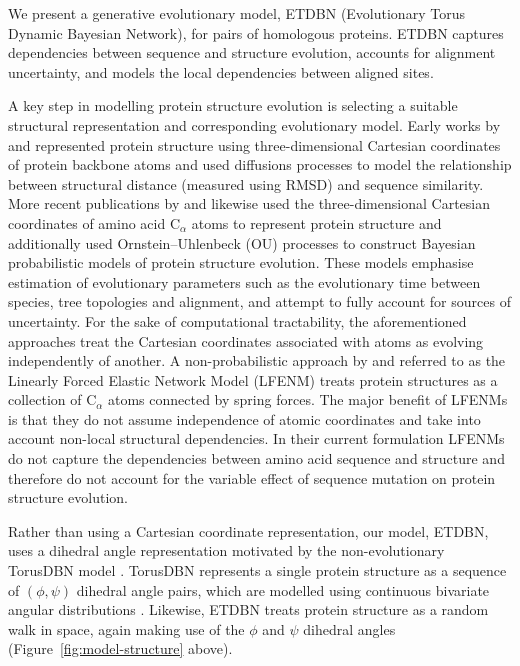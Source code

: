 \documentclass[nogrid]{MBE}%
\begin{document}
We present a generative evolutionary model, ETDBN (Evolutionary Torus Dynamic Bayesian Network), for pairs of homologous proteins. ETDBN captures dependencies between sequence and structure evolution, accounts for alignment uncertainty, and models the local dependencies between aligned sites.

A key step in modelling protein structure evolution is selecting a suitable structural representation and corresponding evolutionary model. Early works by \citet{gutin1994evolution} and \citet{grishin1997estimation} represented protein structure using three-dimensional Cartesian coordinates of protein backbone atoms and used diffusions processes to model the relationship between structural distance (measured using RMSD) and sequence similarity. More recent publications by \citet{challis2012stochastic} and \citet{herman2014simultaneous} likewise used the three-dimensional Cartesian coordinates of amino acid  $\text{C}_{\alpha}$ atoms to represent protein structure and additionally used Ornstein--Uhlenbeck (OU) processes to construct Bayesian probabilistic models of protein structure evolution. These models emphasise estimation of evolutionary parameters such as the evolutionary time between species, tree topologies and alignment, and attempt to fully account for sources of uncertainty. For the sake of computational tractability, the aforementioned approaches treat the Cartesian coordinates associated with atoms as evolving independently of another. A non-probabilistic approach by \citet{echave2008evolutionary} and \citet{echave2010perturbative} referred to as the Linearly Forced Elastic Network Model (LFENM)  treats protein structures as a collection of $\text{C}_{\alpha}$ atoms connected by spring forces. The major benefit of LFENMs is that they do not assume independence of atomic coordinates and take into account non-local structural dependencies. In their current formulation LFENMs do not capture the dependencies between amino acid sequence and structure and therefore do not account for the variable effect of sequence mutation on protein structure evolution.

Rather than using a Cartesian coordinate representation, our model, ETDBN, uses a dihedral angle representation motivated by the non-evolutionary TorusDBN model \citep{boomsma2008generative, boomsma2014equilibrium}. TorusDBN represents a single protein structure as a sequence of $(\phi,\psi)$ dihedral angle pairs, which are modelled using continuous bivariate angular distributions \citep{frellsen2012towards}. Likewise, ETDBN treats protein structure  as a random walk in space, again making use of the $\phi$ and $\psi$ dihedral angles (Figure~\ref{fig:model-structure} above).
\end{document}
